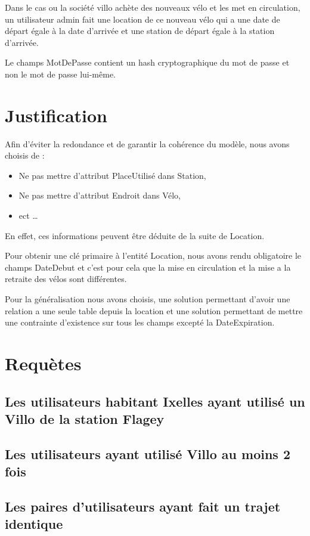 \documentclass[a4paper,10pt]{article}
\begin{document}
Dans le cas ou la société villo achète des nouveaux vélo et les met en circulation, un utilisateur admin fait une location de ce nouveau vélo qui a une date de départ égale à la date d'arrivée et une station de départ égale à la station d'arrivée.

Le champs MotDePasse contient un hash cryptographique du mot de passe et non le mot de passe lui-m\^eme.

\section{Justification}

Afin d'éviter la redondance et de garantir la cohérence du modèle, nous avons choisis de :
\begin{itemize}
  \item Ne pas mettre d'attribut PlaceUtilisé dans Station,
  \item Ne pas mettre d'attribut Endroit dans Vélo,
  \item ect \ldots
\end{itemize}
En effet, ces informations peuvent être déduite de la suite de Location.

Pour obtenir une clé primaire à l'entité Location, nous avons rendu obligatoire le champs DateDebut et c'est pour cela que la mise en circulation et la mise a la retraite des vélos sont différentes.

Pour la généralisation nous avons choisis, une solution permettant d'avoir une relation a une seule table depuis la location et une solution permettant de mettre une contrainte d'existence sur tous les champs excepté la DateExpiration. 

\section{Requètes}

\subsection{Les utilisateurs habitant Ixelles ayant utilisé un Villo de la station Flagey}

\subsection{Les utilisateurs ayant utilisé Villo au moins 2 fois}

\subsection{Les paires d'utilisateurs ayant fait un trajet identique}
\end{document}

